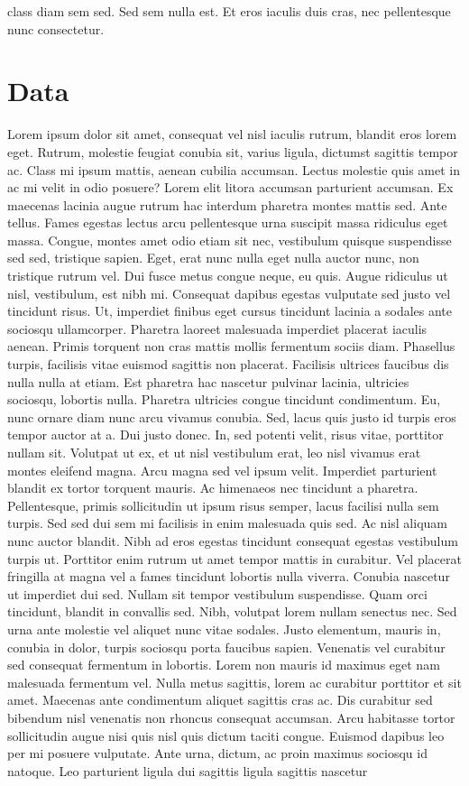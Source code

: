 \documentclass[
  12pt,
]{article}
\begin{document}
class diam sem sed. Sed sem nulla est. Et eros iaculis duis cras, nec pellentesque nunc consectetur.

\hypertarget{data}{%
\section{Data}\label{data}}

Lorem ipsum dolor sit amet, consequat vel nisl iaculis rutrum, blandit eros lorem eget. Rutrum, molestie feugiat conubia sit, varius ligula, dictumst sagittis tempor ac. Class mi ipsum mattis, aenean cubilia accumsan. Lectus molestie quis amet in ac mi velit in odio posuere? Lorem elit litora accumsan parturient accumsan. Ex maecenas lacinia augue rutrum hac interdum pharetra montes mattis sed. Ante tellus. Fames egestas lectus arcu pellentesque urna suscipit massa ridiculus eget massa. Congue, montes amet odio etiam sit nec, vestibulum quisque suspendisse sed sed, tristique sapien. Eget, erat nunc nulla eget nulla auctor nunc, non tristique rutrum vel. Dui fusce metus congue neque, eu quis. Augue ridiculus ut nisl, vestibulum, est nibh mi. Consequat dapibus egestas vulputate sed justo vel tincidunt risus. Ut, imperdiet finibus eget cursus tincidunt lacinia a sodales ante sociosqu ullamcorper. Pharetra laoreet malesuada imperdiet placerat iaculis aenean. Primis torquent non cras mattis mollis fermentum sociis diam. Phasellus turpis, facilisis vitae euismod sagittis non placerat. Facilisis ultrices faucibus dis nulla nulla at etiam. Est pharetra hac nascetur pulvinar lacinia, ultricies sociosqu, lobortis nulla. Pharetra ultricies congue tincidunt condimentum. Eu, nunc ornare diam nunc arcu vivamus conubia. Sed, lacus quis justo id turpis eros tempor auctor at a. Dui justo donec. In, sed potenti velit, risus vitae, porttitor nullam sit. Volutpat ut ex, et ut nisl vestibulum erat, leo nisl vivamus erat montes eleifend magna. Arcu magna sed vel ipsum velit. Imperdiet parturient blandit ex tortor torquent mauris. Ac himenaeos nec tincidunt a pharetra. Pellentesque, primis sollicitudin ut ipsum risus semper, lacus facilisi nulla sem turpis. Sed sed dui sem mi facilisis in enim malesuada quis sed. Ac nisl aliquam nunc auctor blandit. Nibh ad eros egestas tincidunt consequat egestas vestibulum turpis ut. Porttitor enim rutrum ut amet tempor mattis in curabitur. Vel placerat fringilla at magna vel a fames tincidunt lobortis nulla viverra. Conubia nascetur ut imperdiet dui sed. Nullam sit tempor vestibulum suspendisse. Quam orci tincidunt, blandit in convallis sed. Nibh, volutpat lorem nullam senectus nec. Sed urna ante molestie vel aliquet nunc vitae sodales. Justo elementum, mauris in, conubia in dolor, turpis sociosqu porta faucibus sapien. Venenatis vel curabitur sed consequat fermentum in lobortis. Lorem non mauris id maximus eget nam malesuada fermentum vel. Nulla metus sagittis, lorem ac curabitur porttitor et sit amet. Maecenas ante condimentum aliquet sagittis cras ac. Dis curabitur sed bibendum nisl venenatis non rhoncus consequat accumsan. Arcu habitasse tortor sollicitudin augue nisi quis nisl quis dictum taciti congue. Euismod dapibus leo per mi posuere vulputate. Ante urna, dictum, ac proin maximus sociosqu id natoque. Leo parturient ligula dui sagittis ligula sagittis nascetur 
\end{document}
